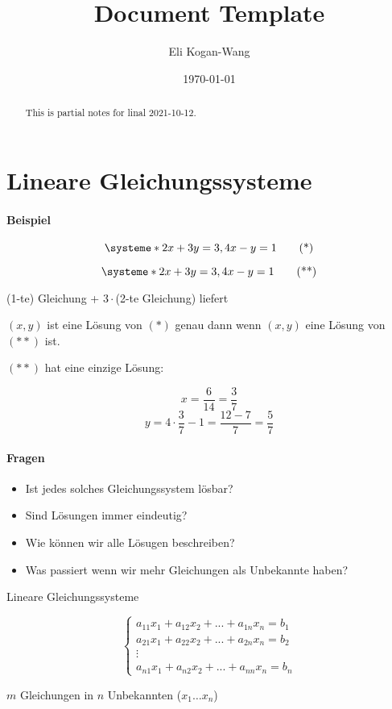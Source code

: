 \documentclass[a4paper,12pt]{article}
\title{Document Template}
\author{Eli Kogan-Wang}
\date{\today}
\begin{document}
\renewcommand{\abstractname}{Abstract}
\begin{abstract}
  This is partial notes for linal 2021-10-12.
\end{abstract}
\section{Lineare Gleichungssysteme}

\paragraph*{Beispiel}

\[
  \systeme*{2x+3y=3,4x-y=1}
  \tag{*}
\]

\[
  \systeme*{2x+3y=3,4x-y=1}
  \tag{**}
\]

(1-te) Gleichung + $3\cdot$(2-te Gleichung) liefert

$(x,y)$ ist eine Lösung von $(*)$ genau dann wenn $(x,y)$ eine Lösung von $(**)$ ist.

$(**)$ hat eine einzige Lösung:

$$x=\frac{6}{14}=\frac{3}{7}$$
$$y=4\cdot\frac{3}{7}-1=\frac{12-7}{7}=\frac{5}{7}$$

\paragraph*{Fragen}

\begin{itemize}
  \item Ist jedes solches Gleichungssystem lösbar?
  \item Sind Lösungen immer eindeutig?
  \item Wie können wir alle Lösugen beschreiben?
  \item Was passiert wenn wir mehr Gleichungen als Unbekannte haben?
\end{itemize}

Lineare Gleichungssysteme


\[
  \left\{
  \begin{aligned}
    a_{11}x_{1}+a_{12}x_{2}+...+a_{1n}x_{n}=b_{1} \\
    a_{21}x_{1}+a_{22}x_{2}+...+a_{2n}x_{n}=b_{2} \\
    \vdots                                        \\
    a_{n1}x_{1}+a_{n2}x_{2}+...+a_{nn}x_{n}=b_{n}
  \end{aligned}
  \right.
\]

$m$ Gleichungen in $n$ Unbekannten ($x_1\dots x_n$)
\end{document}
